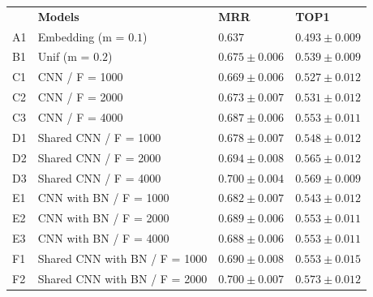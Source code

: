 \documentclass[sigconf]{acmart}
\begin{document}
\begin{table}[t]
\centering
\begin{tabular}{ p{1cm} p{6cm} >{\raggedleft\arraybackslash}p{4cm} >{\raggedleft\arraybackslash}p{4cm} }
 \hline
    & & \multicolumn{2}{c}{\textbf{Results}}\\
 \hline
 & \textbf{Models} & \textbf{MRR} & \textbf{TOP1}\\
 \hline
 A1 & Embedding (m = $0.1$) & $0.637$& $0.493 \pm 0.009$\\
 
 \hline
 
 B1 & Unif (m = $0.2$) & $0.675 \pm 0.006$ & $0.539 \pm 0.009$\\
 
 \hline
 
 C1 & CNN / F = 1000 & $0.669 \pm 0.006$ & $0.527 \pm 0.012$\\
 
 C2 & CNN / F = 2000 & $0.673 \pm 0.007$ & $0.531 \pm 0.012$\\
 
 C3 & CNN / F = 4000 & $0.687 \pm 0.006$ & $0.553 \pm 0.011$\\
 
 \hline
 
 D1 & Shared CNN / F = 1000 & $0.678 \pm 0.007$ & $0.548 \pm 0.012$\\
 
 D2 & Shared CNN / F = 2000 & $0.694 \pm 0.008$ & $0.565 \pm 0.012$\\
 
 D3 & Shared CNN / F = 4000 & $0.700 \pm 0.004$ & $0.569 \pm 0.009$\\
 
 \hline
 
 E1 & CNN with BN / F = 1000 & $0.682 \pm 0.007$ & $0.543 \pm 0.012$\\
 
 E2 & CNN with BN / F = 2000 & $0.689 \pm 0.006$ & $0.553 \pm 0.011$\\
 
 E3 & CNN with BN / F = 4000 & $0.688 \pm 0.006$ & $0.553 \pm 0.011$\\
 
 \hline
 
 F1 & Shared CNN with BN / F = 1000 & $0.690 \pm 0.008$ & $0.553 \pm 0.015$\\
 
 F2 & Shared CNN with BN / F = 2000 & $0.700 \pm 0.007$ & $0.573 \pm 0.012$\\
 

\end{tabular}
\end{table}
\end{document}
